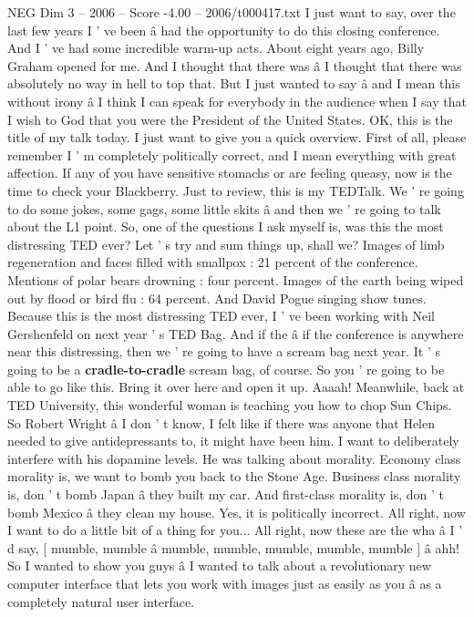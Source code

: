\begin{textsample}{NEG Dim 3 – 2006 – Score -4.00 – 2006/t000417.txt}  \label{ex:f3_neg_016}
I just want to say, over the last few years I ' ve been â had the opportunity to do this closing conference.
And I ' ve had some incredible warm-up acts.
About eight years ago, Billy Graham opened for me.
And I thought that there was â I thought that there was absolutely no way in hell to top that.
But I just wanted to say â and I mean this without irony â I think I can speak for everybody in the audience when I say that I wish to God that you were the President of the United States.
OK, this is the title of my talk today.
I just want to give you a quick overview.
First of all, please remember I ' m completely politically correct, and I mean everything with great affection.
If any of you have sensitive stomachs or are feeling queasy, now is the time to check your Blackberry.
Just to review, this is my TEDTalk.
We ' re going to do some jokes, some gags, some little skits â and then we ' re going to talk about the L1 point.
So, one of the questions I ask myself is, was this the most distressing TED ever?
Let ' s try and sum things up, shall we?
Images of limb regeneration and faces filled with smallpox : 21 percent of the conference.
Mentions of polar bears drowning : four percent.
Images of the earth being wiped out by flood or bird flu : 64 percent.
And David Pogue singing show tunes.
Because this is the most distressing TED ever, I ' ve been working with Neil Gershenfeld on next year ' s TED Bag.
And if the â if the conference is anywhere near this distressing, then we ' re going to have a scream bag next year.
It ' s going to be a \textbf{cradle-to-cradle} scream bag, of course.
So you ' re going to be able to go like this.
Bring it over here and open it up.
Aaaah!
Meanwhile, back at TED University, this wonderful woman is teaching you how to chop Sun Chips.
So Robert Wright â I don ' t know, I felt like if there was anyone that Helen needed to give antidepressants to, it might have been him.
I want to deliberately interfere with his dopamine levels.
He was talking about morality.
Economy class morality is, we want to bomb you back to the Stone Age.
Business class morality is, don ' t bomb Japan â they built my car.
And first-class morality is, don ' t bomb Mexico â they clean my house.
Yes, it is politically incorrect.
All right, now I want to do a little bit of a thing for you...
All right, now these are the wha â I ' d say, [ mumble, mumble â mumble, mumble, mumble, mumble, mumble ] â ahh!
So I wanted to show you guys â I wanted to talk about a revolutionary new computer interface that lets you work with images just as easily as you â as a completely natural user interface.

\end{textsample}
